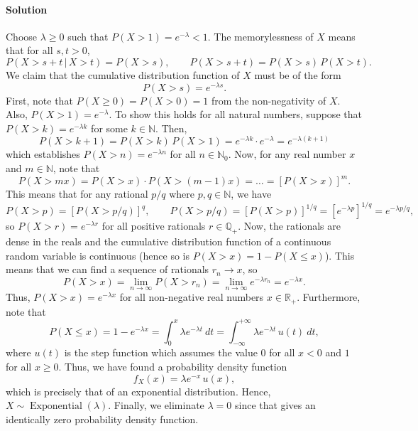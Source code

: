 \documentclass[10pt]{article}
\newcounter{prob}
\def\solution{\paragraph{Solution}}
\newcommand\op[1]{\operatorname{#1}}
\begin{document}
        \solution Choose $\lambda \geq 0$ such that $P(X > 1) = e^{-\lambda} < 1$.
        The memorylessness of $X$ means that for all $s, t > 0$, \[
            P(X > s + t \,|\, X > t) = P(X > s), \qquad 
            P(X > s + t) = P(X > s) \, P(X > t).
        \]
        We claim that the cumulative distribution function of $X$ must be of the
        form \[
            P(X > s) = e^{-\lambda s}.
        \] First, note that $P(X \geq 0) = P(X > 0) = 1$ from the non-negativity of
        $X$. Also, $P(X > 1) = e^{-\lambda}$. To show this holds for all natural
        numbers, suppose that $P(X > k) = e^{-\lambda k}$ for some $k \in
        \mathbb{N}$. Then,
        \[
            P(X > k + 1) = P(X > k)\, P(X > 1) = e^{-\lambda k}\cdot e^{-\lambda} =
            e^{-\lambda (k + 1)}
        \] which establishes $P(X > n) = e^{-\lambda n}$ for all $n \in
        \mathbb{N}_0$. Now, for any real number $x$ and $m \in \mathbb{N}$, note 
        that \[
            P(X > mx) = P(X > x)\cdot P(X > (m - 1)x) = \dots = \left[P(X >
            x)\right]^m.
        \] This means that for any rational $p / q$ where $p, q \in \mathbb{N}$, we
        have \[
            P(X > p) = \left[ P(X > p / q) \right]^q, \qquad
            P(X > p / q) = \left[ P(X > p) \right]^{1 / q} = \left[e^{-\lambda
            p}\right]^{1 / q} = e^{-\lambda p / q},
        \] so $P(X > r) = e^{-\lambda r}$ for all positive rationals $r \in
        \mathbb{Q}_+$. Now, the rationals are dense in the reals and the cumulative
        distribution function of a continuous random variable is continuous (hence
        so is $P(X > x) = 1 - P(X \leq x)$).
        This means that we can find a sequence of rationals $r_n \to x$, so \[
            P(X > x) = \lim_{n \to \infty} P(X > r_n) = \lim_{n \to \infty}
            e^{-\lambda r_n} = e^{-\lambda x}.
        \] Thus, $P(X > x) = e^{-\lambda x}$  for all non-negative real numbers $x
        \in \mathbb{R}_+$. Furthermore, note that \[
            P(X \leq x) = 1 - e^{-\lambda x} = 
                \int_0^x \lambda e^{-\lambda t}\:dt =
                \int_{-\infty}^{+\infty} \lambda e^{-\lambda t}\, u(t)\:dt,
        \] where $u(t)$ is the step function which assumes the value $0$ for all $x
        < 0$ and $1$ for all $x \geq 0$. Thus, we have found a probability density
        function \[
            f_X(x) = \lambda e^{-x}\, u(x),
        \] which is precisely that of an exponential distribution. Hence, $X \sim
        \op{Exponential}(\lambda)$. Finally, we eliminate $\lambda = 0$ since that
        gives an identically zero probability density function.
\end{document}
